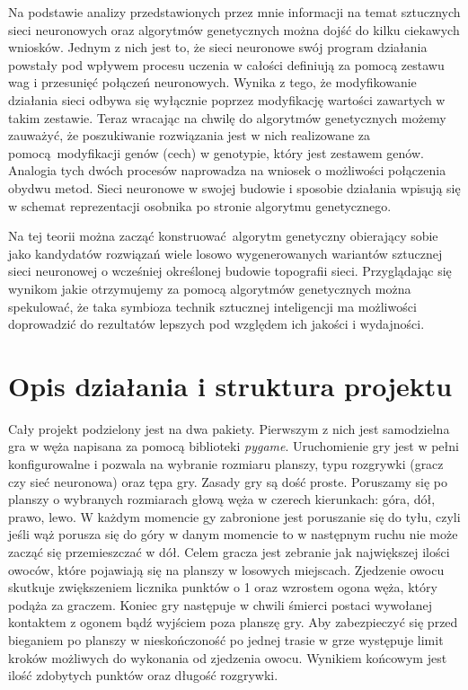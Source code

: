 \documentclass[12pt, oneside, a4paper]{report}
\begin{document}
Na podstawie analizy przedstawionych przez mnie informacji na temat sztucznych sieci neuronowych oraz algorytmów genetycznych można dojść do kilku ciekawych wniosków. Jednym z nich jest to, że sieci neuronowe swój program działania powstały pod wpływem procesu uczenia w całości definiują za pomocą zestawu wag i przesunięć połączeń neuronowych. Wynika z tego, że modyfikowanie działania sieci odbywa się wyłącznie poprzez modyfikację wartości zawartych w takim zestawie. Teraz wracając na chwilę do algorytmów genetycznych możemy zauważyć, że poszukiwanie rozwiązania jest w nich realizowane za pomocą modyfikacji genów (cech) w genotypie, który jest zestawem genów. Analogia tych dwóch procesów naprowadza na wniosek o możliwości połączenia obydwu metod. Sieci neuronowe w swojej budowie i sposobie działania wpisują się w schemat reprezentacji osobnika po stronie algorytmu genetycznego.

Na tej teorii można zacząć konstruować algorytm genetyczny obierający sobie jako kandydatów rozwiązań wiele losowo wygenerowanych wariantów sztucznej sieci neuronowej o wcześniej określonej budowie topografii sieci. Przyglądając się wynikom jakie otrzymujemy za pomocą algorytmów genetycznych można spekulować, że taka symbioza technik sztucznej inteligencji ma możliwości doprowadzić do rezultatów lepszych pod względem ich jakości i wydajności.

\section{Opis działania i struktura projektu}

Cały projekt podzielony jest na dwa pakiety. Pierwszym z nich jest samodzielna gra w węża napisana za pomocą biblioteki \textit{pygame}. Uruchomienie gry jest w pełni konfigurowalne i pozwala na wybranie rozmiaru planszy, typu rozgrywki (gracz czy sieć neuronowa) oraz tępa gry. Zasady gry są dość proste. Poruszamy się po planszy o wybranych rozmiarach głową węża w czerech kierunkach: góra, dół, prawo, lewo. W każdym momencie gy zabronione jest poruszanie się do tyłu, czyli jeśli wąż porusza się do góry w danym momencie to w następnym ruchu nie może zacząć się przemieszczać w dół. Celem gracza jest zebranie jak największej ilości owoców, które pojawiają się na planszy w losowych miejscach. Zjedzenie owocu skutkuje zwiększeniem licznika punktów o 1 oraz wzrostem ogona węża, który podąża za graczem. Koniec gry następuje w chwili śmierci postaci wywołanej kontaktem z ogonem bądź wyjściem poza planszę gry. Aby zabezpieczyć się przed bieganiem po planszy w nieskończoność po jednej trasie w grze występuje limit kroków możliwych do wykonania od zjedzenia owocu. Wynikiem końcowym jest ilość zdobytych punktów oraz długość rozgrywki.
\end{document}
